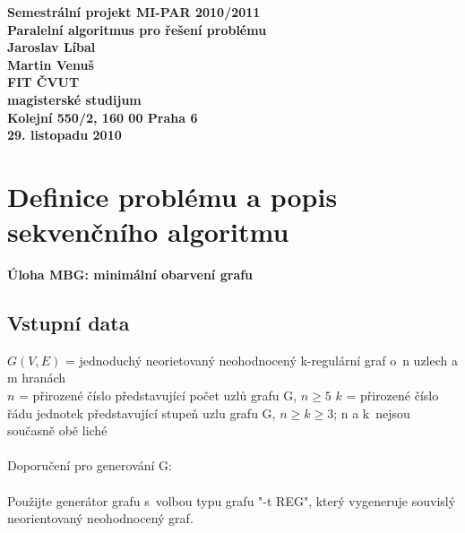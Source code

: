 \documentclass[12pt]{article}
\begin{document}

\begin{center}
\bf Semestrální projekt MI-PAR 2010/2011\\[5mm]
    Paralelní algoritmus pro řešení problému\\[5mm]
       Jaroslav Líbal\\
       Martin Venuš\\[5mm]
FIT ČVUT\\[2mm]
magisterské studijum\\[2mm]
Kolejní 550/2, 160 00 Praha 6\\[2mm]
29. listopadu 2010
\end{center}

\newpage
\tableofcontents
\newpage

\section{Definice problému a popis sekvenčního algoritmu}
\textbf{Úloha MBG: minimální obarvení grafu}

\subsection{Vstupní data}

$G(V,E)$ = jednoduchý neorietovaný neohodnocený k-regulární graf o~n uzlech a m hranách\\
$n$ = přirozené číslo představující počet uzlů grafu G, $n \geq 5$
$k$ = přirozené číslo řádu jednotek představující stupeň uzlu grafu G, $n \geq k \geq 3$; n a k~nejsou současně obě liché\\
\\
Doporučení pro generování G:\\
\\
Použijte generátor grafu s~volbou typu grafu "-t REG", který vygeneruje souvislý neorientovaný neohodnocený graf.
\end{document}
